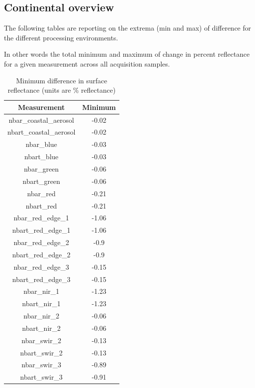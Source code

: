 \documentclass[a4paper]{article}
\begin{document}
    \subsection{Continental overview}

    \begin{flushleft}
      The following tables are reporting on the extrema (min and max) of difference for the different processing environments. \par
      In other words the total minimum and maximum of change in percent reflectance for a given measurement across all acquisition samples. \par
    \end{flushleft}

    \begin{table}[ht!]
      \caption{Minimum difference in surface reflectance (units are \% reflectance)}\label{table:1}
      \centering
      \begin{tabular}{cc} \midrule
        \textbf{Measurement} & \textbf{Minimum} \\ \midrule
        nbar\_coastal\_aerosol & -0.02 \\
        nbart\_coastal\_aerosol & -0.02 \\
        nbar\_blue & -0.03 \\
        nbart\_blue & -0.03 \\
        nbar\_green & -0.06 \\
        nbart\_green & -0.06 \\
        nbar\_red & -0.21 \\
        nbart\_red & -0.21 \\
        nbar\_red\_edge\_1 & -1.06 \\
        nbart\_red\_edge\_1 & -1.06 \\
        nbar\_red\_edge\_2 & -0.9 \\
        nbart\_red\_edge\_2 & -0.9 \\
        nbar\_red\_edge\_3 & -0.15 \\
        nbart\_red\_edge\_3 & -0.15 \\
        nbar\_nir\_1 & -1.23 \\
        nbart\_nir\_1 & -1.23 \\
        nbar\_nir\_2 & -0.06 \\
        nbart\_nir\_2 & -0.06 \\
        nbar\_swir\_2 & -0.13 \\
        nbart\_swir\_2 & -0.13 \\
        nbar\_swir\_3 & -0.89 \\
        nbart\_swir\_3 & -0.91 \\ \midrule
      \end{tabular}
    \end{table}
\end{document}
